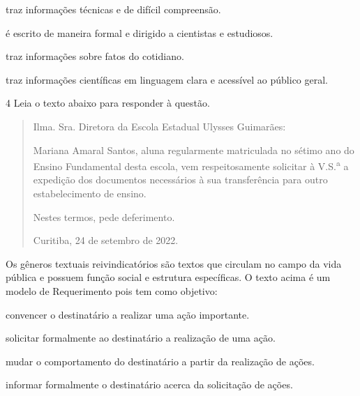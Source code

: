 \begin{escolha}
  
  \item traz informações técnicas e de difícil compreensão.
  
  \item é escrito de maneira formal e dirigido a cientistas e estudiosos.
  
  \item traz informações sobre fatos do cotidiano.
  
  \item traz informações científicas em linguagem clara e acessível ao público
  geral.

\end{escolha}

\pagebreak

\num{4} Leia o texto abaixo para responder à questão.

\begin{quote}

Ilma. Sra. Diretora da Escola Estadual Ulysses Guimarães:

Mariana Amaral Santos, aluna regularmente matriculada no sétimo ano do
Ensino Fundamental desta escola, vem respeitosamente solicitar à V.S.\textsuperscript{a} a
expedição dos documentos necessários à sua transferência para outro
estabelecimento de ensino.

Nestes termos, pede deferimento.

Curitiba, 24 de setembro de 2022.

\end{quote}


Os gêneros textuais reivindicatórios são textos que circulam no campo da
vida pública e possuem função social e estrutura específicas. O texto
acima é um modelo de Requerimento pois tem como objetivo:

\begin{escolha} 

\item convencer o destinatário a realizar uma ação importante.

\item solicitar formalmente ao destinatário a realização de uma ação.

\item mudar o comportamento do destinatário a partir da realização de ações.

\item informar formalmente o destinatário acerca da solicitação de ações.

\end{escolha}

